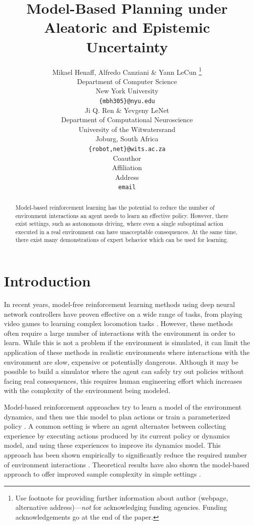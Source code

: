 \documentclass{article} %
\title{Model-Based Planning under Aleatoric and Epistemic Uncertainty}
\author{Mikael Henaff, Alfredo Canziani \& Yann LeCun \thanks{ Use footnote for providing further information
about author (webpage, alternative address)---\emph{not} for acknowledging
funding agencies.  Funding acknowledgements go at the end of the paper.} \\
Department of Computer Science\\
New York University\\
\texttt{\{mbh305\}@nyu.edu} \\
\And
Ji Q. Ren \& Yevgeny LeNet \\
Department of Computational Neuroscience \\
University of the Witwatersrand \\
Joburg, South Africa \\
\texttt{\{robot,net\}@wits.ac.za} \\
\AND
Coauthor \\
Affiliation \\
Address \\
\texttt{email}
}
\begin{document}
\maketitle

\begin{abstract}
  Model-based reinforcement learning has the potential to reduce the number of environment interactions an agent needs to learn an effective policy.
  However, there exist settings, such as autonomous driving, where even a single suboptimal action executed in a real environment can have unacceptable consequences.
  At the same time, there exist many demonstrations of expert behavior which can be used for learning.
\end{abstract}

\section{Introduction}

In recent years, model-free reinforcement learning methods using deep neural network controllers have proven effective on a wide range of tasks, from playing video games \citep{mnih15, A3C} to learning complex locomotion tasks \citep{Lillicrap2015}.
However, these methods often require a large number of interactions with the environment in order to learn. 
While this is not a problem if the environment is simulated, it can limit the application of these methods in realistic environments where interactions with the environment are slow, expensive or potentially dangerous.
Although it may be possible to build a simulator where the agent can safely try out policies without facing real consequences, this requires human engineering effort which increases with the complexity of the environment being modeled.


Model-based reinforcement approaches try to learn a model of the environment dynamics, and then use this model to plan actions or train a parameterized policy \citep{Nguyen1990, Schmidhuber1990, Jordan1992}.
A common setting is where an agent alternates between collecting experience by executing actions produced by its current policy or dynamics model, and using these experiences to improve its dynamics model.
This approach has been shown empirically to significantly reduce the required number of environment interactions \citep{Atkeson1997, PILCO, Nagabandi2017, Chua2018}. 
Theoretical results have also shown the model-based approach to offer improved sample complexity in simple settings \citep{LS-LQR, Recht2018}. 
\end{document}

